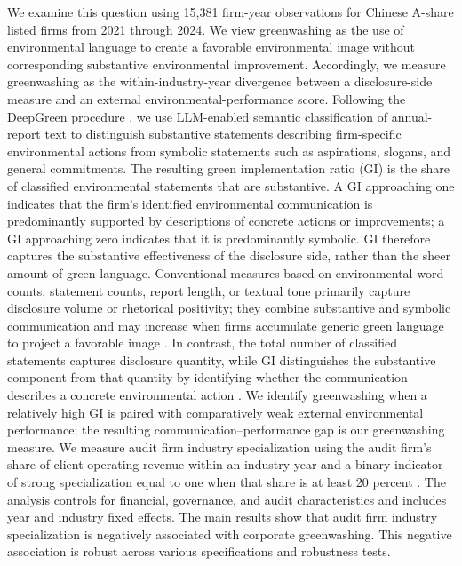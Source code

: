 \documentclass[11pt]{article}
\begin{document}
We examine this question using 15,381 firm-year observations for Chinese A-share listed firms from 2021 through 2024. 
We view greenwashing as the use of environmental language to create a favorable environmental image without corresponding substantive environmental improvement. 
Accordingly, we measure greenwashing as the within-industry-year divergence between a disclosure-side measure and an external environmental-performance score. 
Following the DeepGreen procedure \citep{xu2026deepgreen}, 
we use LLM-enabled semantic classification of annual-report text to distinguish substantive statements describing firm-specific environmental actions from symbolic statements such as aspirations, slogans, and general commitments. 
The resulting green implementation ratio (GI) is the share of classified environmental statements that are substantive. 
A GI approaching one indicates that the firm's identified environmental communication is predominantly supported by descriptions of concrete actions or improvements; 
a GI approaching zero indicates that it is predominantly symbolic. 
GI therefore captures the substantive effectiveness of the disclosure side, rather than the sheer amount of green language. 
Conventional measures based on environmental word counts, statement counts, report length, or textual tone primarily capture disclosure volume or rhetorical positivity; they combine substantive and symbolic communication and may increase when firms accumulate generic green language to project a favorable image \citep{lubloy2025quantifying,yu2020greenwashing,grewal2022unrepresentative,walker2012harm}. 
In contrast, the total number of classified statements captures disclosure quantity, while GI distinguishes the substantive component from that quantity by identifying whether the communication describes a concrete environmental action \citep{clarkson2008revisiting,hummel2016relationship,xu2026deepgreen}. 
We identify greenwashing when a relatively high GI is paired with comparatively weak external environmental performance; 
the resulting communication--performance gap is our greenwashing measure. 
We measure audit firm industry specialization using the audit firm's share of client operating revenue within an industry-year and a binary indicator of strong specialization equal to one when that share is at least 20 percent \citep{cai2007specialization,krishnan2003expertise}.
The analysis controls for financial, governance, and audit characteristics and includes year and industry fixed effects.
The main results show that audit firm industry specialization is negatively associated with corporate greenwashing. This negative association is robust across various specifications and robustness tests.
\end{document}
